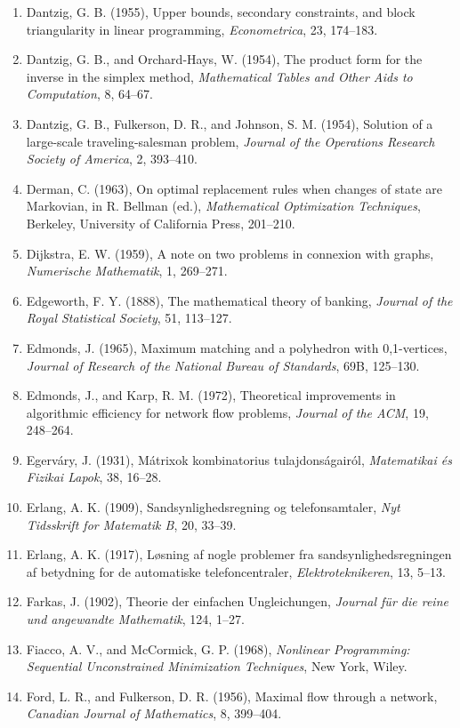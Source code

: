 \documentclass[11pt,a4paper]{article}
\numberwithin{equation}{section}
\theoremstyle{definition}
\begin{document}
\begin{enumerate}
\item Dantzig, G. B. (1955), Upper bounds, secondary constraints, and block triangularity in linear programming, \emph{Econometrica}, 23, 174--183.
\item Dantzig, G. B., and Orchard-Hays, W. (1954), The product form for the inverse in the simplex method, \emph{Mathematical Tables and Other Aids to Computation}, 8, 64--67.
\item Dantzig, G. B., Fulkerson, D. R., and Johnson, S. M. (1954), Solution of a large-scale traveling-salesman problem, \emph{Journal of the Operations Research Society of America}, 2, 393--410.
\item Derman, C. (1963), On optimal replacement rules when changes of state are Markovian, in R. Bellman (ed.), \emph{Mathematical Optimization Techniques}, Berkeley, University of California Press, 201--210.
\item Dijkstra, E. W. (1959), A note on two problems in connexion with graphs, \emph{Numerische Mathematik}, 1, 269--271.
\item Edgeworth, F. Y. (1888), The mathematical theory of banking, \emph{Journal of the Royal Statistical Society}, 51, 113--127.
\item Edmonds, J. (1965), Maximum matching and a polyhedron with 0,1-vertices, \emph{Journal of Research of the National Bureau of Standards}, 69B, 125--130.
\item Edmonds, J., and Karp, R. M. (1972), Theoretical improvements in algorithmic efficiency for network flow problems, \emph{Journal of the ACM}, 19, 248--264.
\item Egerv\'ary, J. (1931), M\'atrixok kombinatorius tulajdons\'agair\'ol, \emph{Matematikai \'es Fizikai Lapok}, 38, 16--28.
\item Erlang, A. K. (1909), Sandsynlighedsregning og telefonsamtaler, \emph{Nyt Tidsskrift for Matematik B}, 20, 33--39.
\item Erlang, A. K. (1917), L\o sning af nogle problemer fra sandsynlighedsregningen af betydning for de automatiske telefoncentraler, \emph{Elektroteknikeren}, 13, 5--13.
\item Farkas, J. (1902), Theorie der einfachen Ungleichungen, \emph{Journal f\"ur die reine und angewandte Mathematik}, 124, 1--27.
\item Fiacco, A. V., and McCormick, G. P. (1968), \emph{Nonlinear Programming: Sequential Unconstrained Minimization Techniques}, New York, Wiley.
\item Ford, L. R., and Fulkerson, D. R. (1956), Maximal flow through a network, \emph{Canadian Journal of Mathematics}, 8, 399--404.

\end{enumerate}
\end{document}
